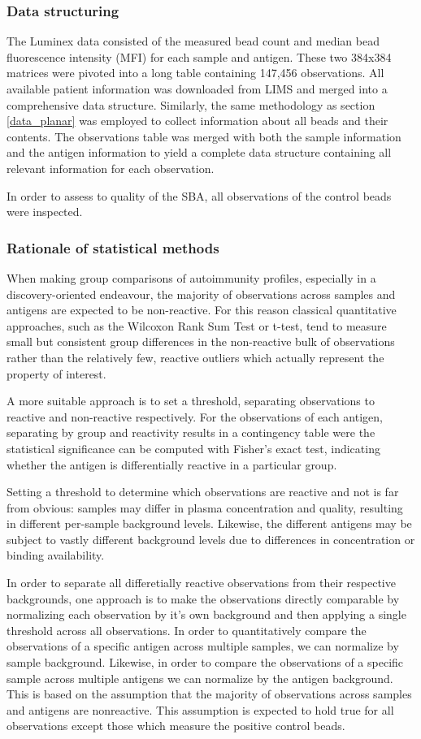 \documentclass{article}
\begin{document}
\subsubsection{Data structuring}
The Luminex data consisted of the measured bead count and median bead fluorescence intensity (MFI) for each sample and antigen. These two 384x384 matrices were pivoted into a long table containing 147,456 observations. All available patient information was downloaded from LIMS and merged into a comprehensive data structure. Similarly, the same methodology as section \ref{data_planar} was employed to collect information about all beads and their contents. The observations table was merged with both the sample information and the antigen information to yield a complete data structure containing all relevant information for each observation.

In order to assess to quality of the SBA, all observations of the control beads were inspected.

\subsubsection{Rationale of statistical methods}\label{statrat}
When making group comparisons of autoimmunity profiles, especially in a discovery-oriented endeavour, the majority of observations across samples and antigens are expected to be non-reactive. For this reason classical quantitative approaches, such as the Wilcoxon Rank Sum Test or t-test, tend to measure small but consistent group differences in the non-reactive bulk of observations rather than the relatively few, reactive outliers which actually represent the property of interest.

A more suitable approach is to set a threshold, separating observations to reactive and non-reactive respectively. For the observations of each antigen, separating by group and reactivity results in a contingency table were the statistical significance can be computed with Fisher's exact test, indicating whether the antigen is differentially reactive in a particular group.

Setting a threshold to determine which observations are reactive and not is far from obvious: samples may differ in plasma concentration and quality, resulting in different per-sample background levels. Likewise, the different antigens may be subject to vastly different background levels due to differences in concentration or binding availability.

In order to separate all differetially reactive observations from their respective backgrounds, one approach is to make the observations directly comparable by normalizing each observation by it's own background and then applying a single threshold across all observations. In order to quantitatively compare the observations of a specific antigen across multiple samples, we can normalize by sample background. Likewise, in order to compare the observations of a specific sample across multiple antigens we can normalize by the antigen background. This is based on the assumption that the majority of observations across samples and antigens are nonreactive. This assumption is expected to hold true for all observations except those which measure the positive control beads.
\end{document}
